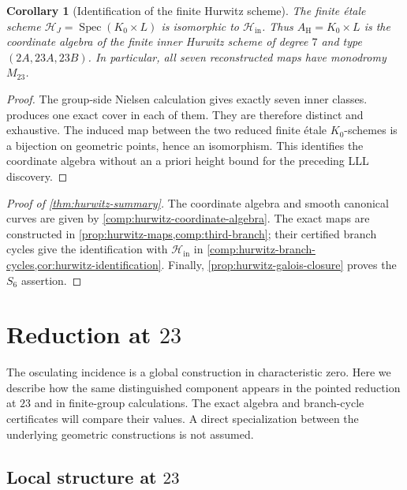 \documentclass[11pt]{amsart}
\newtheorem{corollary}[corollary]{Corollary}
\theoremstyle{definition}
\theoremstyle{remark}
\begin{document}
\begin{corollary}[Identification of the finite Hurwitz scheme]
\label{cor:hurwitz-identification}
The finite étale scheme
$\mathcal H_J=\operatorname{Spec}(K_0\times L)$ is isomorphic to
$\mathcal H_{\mathrm{in}}$.  Thus $A_{\mathrm H}=K_0\times L$ is the
coordinate algebra of the finite inner Hurwitz scheme of degree $7$ and type
$(2A,23A,23B)$.  In particular, all seven reconstructed maps have
monodromy $M_{23}$.
\end{corollary}

\begin{proof}
The group-side Nielsen calculation gives exactly seven inner classes.
 produces one exact cover in each of them.
They are therefore distinct and exhaustive.  The induced map between the
two reduced finite étale $K_0$-schemes is a bijection on geometric points,
hence an isomorphism.  This identifies the coordinate algebra without an
a priori height bound for the preceding LLL discovery.
\end{proof}

\begin{proof}[Proof of \cref{thm:hurwitz-summary}]
The coordinate algebra and smooth canonical curves are given by
\cref{comp:hurwitz-coordinate-algebra}.  The exact maps are constructed in
\cref{prop:hurwitz-maps,comp:third-branch}; their certified branch cycles
give the identification with $\mathcal H_{\mathrm{in}}$ in
\cref{comp:hurwitz-branch-cycles,cor:hurwitz-identification}.  Finally,
\cref{prop:hurwitz-galois-closure} proves the $S_6$ assertion.
\end{proof}

\section{Reduction at \texorpdfstring{$23$}{23}}
\label{sec:reduction}

The osculating incidence is a global construction in characteristic zero.
Here we describe how the same distinguished component appears in the
pointed reduction at $23$ and in finite-group calculations.
The exact algebra and branch-cycle certificates will compare their
values.  A direct specialization between the underlying geometric
constructions is not assumed.

\subsection{Local structure at \texorpdfstring{$23$}{23}}
\end{document}
